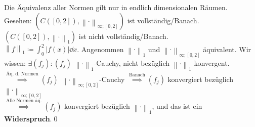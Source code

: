 \begin{subnote*}
	Die Äquivalenz aller Normen gilt nur in endlich dimensionalen Räumen.\\
	Gesehen: $ \left( C([0, 2]), \left\| \cdot  \right\| _{\infty; [0, 2]} \right) $ ist vollständig/Banach.\\
	$ \left( C([0, 2]), \left\| \cdot  \right\| _1 \right)  $ ist nicht vollständig/Banach.\\
	$ \left\| f \right\| _1 \coloneqq \int_{0}^{2}\left| f(x) \right| \dd x $. Angenommen $ \left\| \cdot  \right\| _1 $ und $ \left\| \cdot  \right\| _{\infty; [0, 2]}  $ äquivalent.
	Wir wissen: $ \exists (f_j) : (f_j) $ $ \left\| \cdot  \right\| _1 $-Cauchy, nicht bezüglich $ \left\| \cdot  \right\| _1 $ konvergent.\\
	$ \overset{\text{Äq. d. Normen} }{\implies } (f_j) $ $ \left\| \cdot  \right\| _{\infty;[0, 2]}  $-Cauchy $ \overset{\text{Banach} }{\implies } (f_j) $ konvergiert bezüglich $ \left\| \cdot  \right\| _{\infty;[0, 2]}  $\\
	$ \overset{\text{Alle Normen äq.} }{\implies } (f_j) $ konvergiert bezüglich $ \left\| \cdot  \right\| _1 $, und das ist ein \textbf{Widerspruch}.\qed
\end{subnote*}


